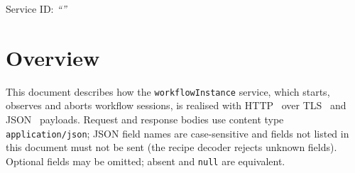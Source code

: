 \documentclass[a4paper]{arrowhead}
\begin{document}
\ArrowheadSetup

\begin{center}
  \vspace*{1cm}
  \huge{\arrowtitle}

  \vspace*{0.2cm}
  \LARGE{\arrowtype}
  \vspace*{1cm}

  \Large{Service ID: \textit{``\arrowid''}}
  \vspace*{\fill}

  

  \vspace*{1cm}
  \vspace*{\fill}

  \begin{abstract}
    This document describes the HTTP/TLS/JSON interface of the \texttt{workflowInstance} service of the Eclipse Arrowhead workflow support systems, service version 1.0.0, documentation edition 5.4.0. It realises the abstract operations of the \texttt{workflowInstance} SD.
  \end{abstract}

  \vspace*{1cm}
\end{center}

\newpage

\tableofcontents
\newpage

\section{Overview}
\label{sec:overview}
This document describes how the \texttt{workflowInstance} service, which starts, observes and aborts workflow sessions, is realised with HTTP~\cite{rfc9110}
over TLS~\cite{rfc8446} and JSON~\cite{rfc8259} payloads. Request and response bodies use content type
\texttt{application/json}; JSON field names are case-sensitive and fields not listed in this document must not be sent
(the recipe decoder rejects unknown fields). Optional fields may be omitted; absent and \texttt{null} are equivalent.
\end{document}
